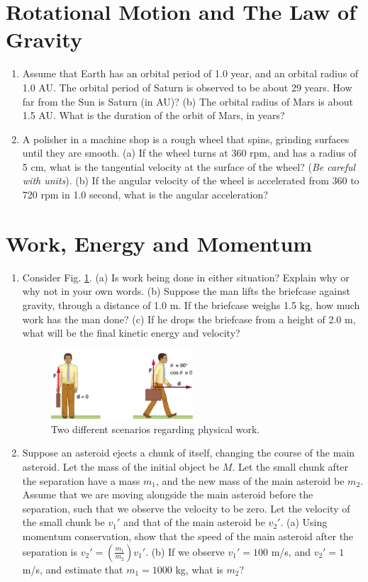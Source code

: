 \documentclass[10pt]{article}
\begin{document}
\section{Rotational Motion and The Law of Gravity}
\begin{enumerate}
\item Assume that Earth has an orbital period of 1.0 year, and an orbital radius of 1.0 AU.  The orbital period of Saturn is observed to be about 29 years.  How far from the Sun is Saturn (in AU)? (b) The orbital radius of Mars is about 1.5 AU.  What is the duration of the orbit of Mars, in years? \\ \vspace{1.5 cm}
\item A polisher in a machine shop is a rough wheel that spins, grinding surfaces until they are smooth.  (a) If the wheel turns at 360 rpm, and has a radius of 5 cm, what is the tangential velocity at the surface of the wheel? (\textit{Be careful with units}). (b) If the angular velocity of the wheel is accelerated from 360 to 720 rpm in 1.0 second, what is the angular acceleration? \\ \vspace{1.0cm}
\end{enumerate}
\section{Work, Energy and Momentum}
\begin{enumerate}
\item Consider Fig. \ref{fig:work}.  (a) Is work being done in either situation?  Explain why or why not in your own words. (b) Suppose the man lifts the briefcase against gravity, through a distance of 1.0 m.  If the briefcase weighs 1.5 kg, how much work has the man done? (c) If he drops the briefcase from a height of 2.0 m, what will be the final kinetic energy and velocity?
\begin{figure}[hb]
\centering
\includegraphics[width=0.5\textwidth]{figures/final1.png}
\caption{\label{fig:work} Two different scenarios regarding physical work.}
\end{figure}
\item Suppose an asteroid ejects a chunk of itself, changing the course of the main asteroid.  Let the mass of the initial object be $M$.  Let the small chunk after the separation have a mass $m_1$, and the new mass of the main asteroid be $m_2$.  Assume that we are moving alongside the main asteroid before the separation, such that we observe the velocity to be zero.  Let the velocity of the small chunk be $v_1'$ and that of the main asteroid be $v_2'$. (a) Using momentum conservation, show that the speed of the main asteroid after the separation is $v_2' = \left(\frac{m_1}{m_2}\right) v_1'$. (b) If we observe $v_1' = 100$ m/s, and $v_2' = 1$ m/s, and estimate that $m_1 = 1000$ kg, what is $m_2$?
\end{enumerate}
\end{document}
